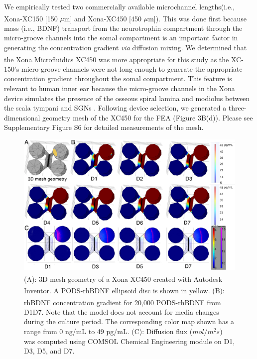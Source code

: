 \documentclass[review]{elsarticle}
\begin{document}
\indent We empirically tested two commercially available microchannel lengths\textemdash (i.e., Xona\textsuperscript{\texttrademark}-XC150 [150 $\mu$m] and Xona\textsuperscript{\texttrademark}-XC450 [450 $\mu$m]). This was done first because mass (i.e., BDNF) transport from the neurotrophin compartment through the micro-groove channels into the somal compartment is an important factor in generating the concentration gradient \textit{via} diffusion mixing.  We determined that the Xona\textsuperscript{\texttrademark} Microfluidics XC450 was more appropriate for this study as the XC-150's micro-groove channels were not long enough to generate the appropriate concentration gradient throughout the somal compartment. This feature is relevant to human inner ear because the micro-groove channels in the Xona device simulates the presence of the osseous spiral lamina and modiolus between the scala tympani and SGNs  \cite{Tuncel2005,Kucuk1991a}. Following device selection, we generated a three-dimensional geometry mesh of the XC450 for the FEA (Figure 3B(d)). Please see Supplementary Figure S6 for detailed measurements of the mesh. 

\begin{figure}
\begin{center}
	\includegraphics[width=13cm]{Fig_6.jpg}
\end{center}
\caption{(A): 3D mesh geometry of a Xona\textsuperscript{\texttrademark} XC450 created with Autodesk Inventor. A PODS\textsuperscript{\textregistered}-rhBDNF ellipsoid disc is shown in yellow. (B): rhBDNF concentration gradient for 20,000 PODS\textsuperscript{\textregistered}-rhBDNF from D1\textendash D7. Note that the model does not account for media changes during the culture period. The corresponding color map shown has a range from 0 ng/mL to 49 pg/mL. (C): Diffusion flux ($mol/m^{2}s$) was computed using COMSOL Chemical Engineering module on D1, D3, D5, and D7.}
\end{figure}
\end{document}
